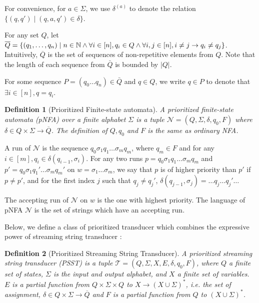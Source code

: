 \documentclass[sigplan,review,anonymous]{acmart}\settopmatter{printfolios=true,printccs=false,printacmref=false}
\newtheorem{definition}{Definition}
\newcommand\pnfa{\mathcal{N}}
\newcommand\psst{\mathcal{T}}
\begin{document}
For convenience, for $a \in \Sigma$, we use $\delta^{(a)}$ to denote the  relation $\{(q, q') \mid (q, a, q') \in \delta\}$.

For any set $Q$, let $\overline{Q} = \{ (q_1, \ldots, q_n) \mid n \in \mathbb{N} \wedge \forall i \in [n], q_i \in Q \wedge \forall i,j \in[n], i
  \neq j \rightarrow q_i \neq q_j \}$. Intuitively, $\overline{Q}$ is the set of
sequences of non-repetitive elements from $Q$. Note that the length of each sequence from $\bar{Q}$ is bounded by 
  $| Q |$.


For some sequence $P = (q_0 \ldots q_n) \in \bar{Q}$ and  $q \in Q$, we write $q \in P$ to denote that
  $\exists i \in [n], q = q_i$.

\begin{definition}[Prioritized Finite-state automata]
  A prioritized finite-state automata (pNFA) over a finite alphabet $\Sigma$ is a tuple $\pnfa=(Q, \Sigma, \delta, q_0, F)$ where $\delta \in Q
  \times \Sigma \rightarrow \overline{Q}$. The definition of $Q, q_0$ and $F$ is the same as ordinary NFA.
\end{definition}

A run of $\pnfa$ is the sequence $q_0 \sigma_1 q_1 \ldots \sigma_m q_m$, where $q_m \in F$ and for any $i \in [m], q_i \in \delta (q_{i - 1}, \sigma_i)$.
  For any two runs $p = q_0 \sigma_1 q_1 \ldots \sigma_m q_m$ and $p' =
  q_0 \sigma_1 q_1' \ldots \sigma_m q_m'$ on $w = \sigma_1 \ldots \sigma_m$, we say that $p$ is of higher priority than
  $p'$ if $p \neq p'$, and for the first index $j$ such that $q_j \neq q_j'$,
  $\delta (q_{j - 1}, \sigma_j) = \ldots q_j \ldots q_j' \ldots$
  
  The accepting run of $\pnfa$ on $w$ is the one with highest priority. The language of pNFA $\pnfa$ is the set of
  strings which have an accepting run.
  
  Below, we define a class of prioritized transducer \cite{BM17} which combines the expressive power of streaming string transducer \cite{AC10,AD11}:
  
\begin{definition}[Prioritized Streaming String Transducer]
A prioritized streaming string transducer (PSST) is a tuple $\psst = (Q, \Sigma, X, E, \delta, q_0, F)$, where $Q$ a
finite set of states, $\Sigma$ is the input and output alphabet, and $X$ a finite set of variables. $E$ is a partial function from $Q \times \Sigma \times
  Q$ to $X \rightarrow (X \cup \Sigma)^{\ast}$, i.e. the set of assignment,
  $\delta \in Q \times \Sigma \rightarrow \overline{Q}$ and $F$ is a partial function
  from $Q$ to $(X \cup \Sigma)^{\ast}$.
  
\end{definition}
\end{document}
